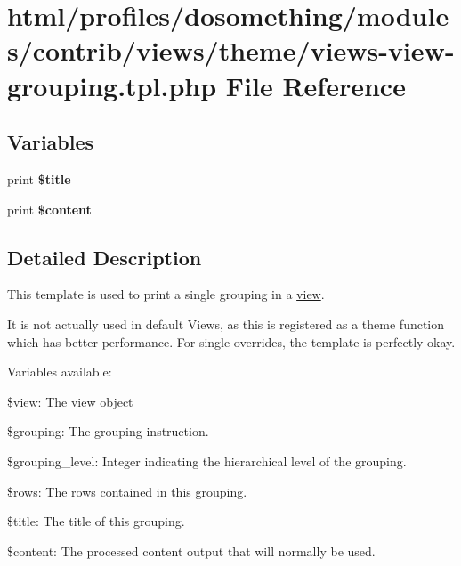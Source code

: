 \hypertarget{views-view-grouping_8tpl_8php}{
\section{html/profiles/dosomething/modules/contrib/views/theme/views-\/view-\/grouping.tpl.php File Reference}
\label{views-view-grouping_8tpl_8php}
}
\subsection*{Variables}
\begin{DoxyCompactItemize}
\item 
\hypertarget{views-view-grouping_8tpl_8php_aec2795512d255332f57cacd930a090b4}{
print {\bfseries \$title}}
\label{views-view-grouping_8tpl_8php_aec2795512d255332f57cacd930a090b4}

\item 
\hypertarget{views-view-grouping_8tpl_8php_ab7b7210f43aa78e34f0b202de894a74c}{
print {\bfseries \$content}}
\label{views-view-grouping_8tpl_8php_ab7b7210f43aa78e34f0b202de894a74c}

\end{DoxyCompactItemize}


\subsection{Detailed Description}
This template is used to print a single grouping in a \hyperlink{classview}{view}.

It is not actually used in default Views, as this is registered as a theme function which has better performance. For single overrides, the template is perfectly okay.

Variables available:
\begin{DoxyItemize}
\item \$view: The \hyperlink{classview}{view} object
\item \$grouping: The grouping instruction.
\item \$grouping\_\-level: Integer indicating the hierarchical level of the grouping.
\item \$rows: The rows contained in this grouping.
\item \$title: The title of this grouping.
\item \$content: The processed content output that will normally be used. 
\end{DoxyItemize}